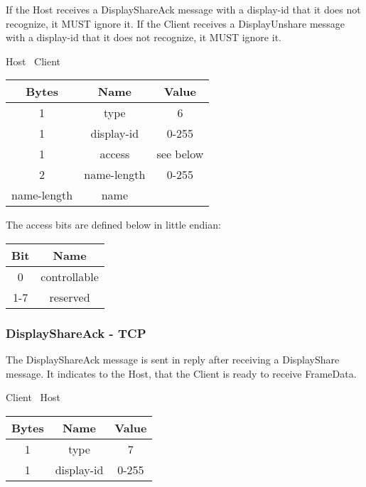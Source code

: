 If the Host receives a DisplayShareAck message with a display-id that it does not recognize, it MUST ignore it.
If the Client receives a DisplayUnshare message with a display-id that it does not recognize, it MUST ignore it.

\begin{center}
    Host \textrightarrow\ Client\\
    \begin{tabular}{|c|c|c|}
        \hline
        \textbf{Bytes} & \textbf{Name} & \textbf{Value} \\
        \hline
        1              & type          & 6              \\
        \hline
        1              & display-id    & 0-255          \\
        \hline
        1              & access        & see below      \\
        \hline
        2              & name-length   & 0-255          \\
        \hline
        name-length    & name          &                \\
        \hline
    \end{tabular}
\end{center}

The access bits are defined below in little endian:

\begin{center}
    \begin{tabular}{|c|c|}
        \hline
        \textbf{Bit} & \textbf{Name} \\
        \hline
        0            & controllable  \\
        \hline
        1-7          & reserved      \\
        \hline
    \end{tabular}
\end{center}

\subsubsection{DisplayShareAck - TCP}

The DisplayShareAck message is sent in reply after receiving a DisplayShare message.
It indicates to the Host, that the Client is ready to receive FrameData.

\begin{center}
    Client \textrightarrow\ Host\\
    \begin{tabular}{|c|c|c|}
        \hline
        \textbf{Bytes} & \textbf{Name} & \textbf{Value} \\
        \hline
        1              & type          & 7              \\
        \hline
        1              & display-id    & 0-255          \\
        \hline
    \end{tabular}
\end{center}

